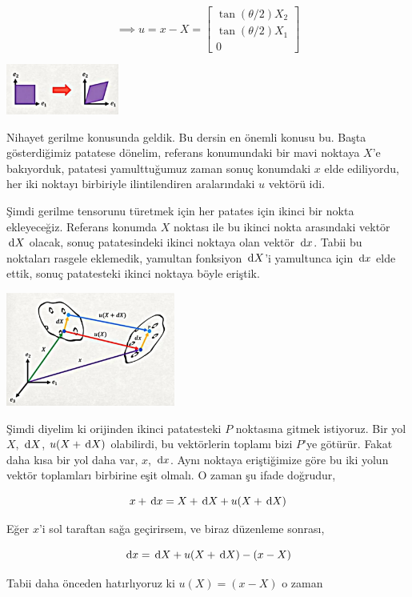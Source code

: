 \documentclass[12pt,fleqn]{article}\usepackage{../../common}
\begin{document}
$$
\implies u = x - X =
\left[\begin{array}{ccc}
\tan(\theta / 2) X_2 \\
\tan(\theta / 2) X_1 \\
0
\end{array}\right]
$$

\includegraphics[width=10em]{phy_020_strs_01_08.jpg}

Nihayet gerilme konusunda geldik. Bu dersin en önemli konusu bu. Başta
gösterdiğimiz patatese dönelim, referans konumundaki bir mavi noktaya $X$'e
bakıyorduk, patatesi yamulttuğumuz zaman sonuç konumdaki $x$ elde ediliyordu,
her iki noktayı birbiriyle ilintilendiren aralarındaki $u$ vektörü idi.

Şimdi gerilme tensorunu türetmek için her patates için ikinci bir nokta
ekleyeceğiz. Referans konumda $X$ noktası ile bu ikinci nokta arasındaki vektör
$\,\mathrm{d} X$ olacak, sonuç patatesindeki ikinci noktaya olan vektör $\,\mathrm{d} x$.  Tabii
bu noktaları rasgele eklemedik, yamultan fonksiyon $\,\mathrm{d} X$'i yamultunca için
$\,\mathrm{d} x$ elde ettik, sonuç patatesteki ikinci noktaya böyle eriştik.

\includegraphics[width=15em]{phy_020_strs_01_09.jpg}

Şimdi diyelim ki orijinden ikinci patatesteki $P$ noktasına gitmek
istiyoruz. Bir yol $X$, $\,\mathrm{d} X$, $u(X+\,\mathrm{d} X)$ olabilirdi, bu vektörlerin toplamı
bizi $P$'ye götürür. Fakat daha kısa bir yol daha var, $x$, $\,\mathrm{d} x$. Aynı
noktaya eriştiğimize göre bu iki yolun vektör toplamları birbirine eşit olmalı.
O zaman şu ifade doğrudur,

$$
x + \,\mathrm{d} x = X + \,\mathrm{d} X + u(X+\,\mathrm{d} X)
$$

Eğer $x$'i sol taraftan sağa geçirirsem, ve biraz düzenleme sonrası,

$$
\,\mathrm{d} x = \,\mathrm{d} X + u(X+\,\mathrm{d} X) - (x - X)
$$

Tabii daha önceden hatırlıyoruz ki $u(X) = (x - X)$ o zaman 
\end{document}
